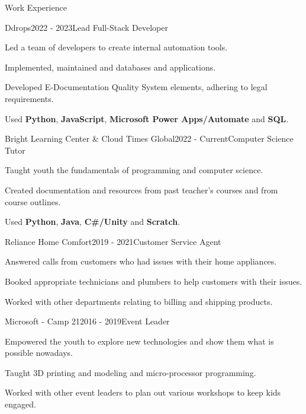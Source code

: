 \documentclass{resume}
\begin{document}
    \begin{rSection}{Work Experience}
        \begin{rSubsection}{Ddrops}{2022 - 2023}{Lead Full-Stack Developer}{}
            \item Led a team of developers to create internal automation tools.
            \item Implemented, maintained and databases and applications.
            \item Developed E-Documentation Quality System elements, adhering to legal requirements.
            \item Used \textbf{Python}, \textbf{JavaScript}, \textbf{Microsoft Power Apps/Automate} and \textbf{SQL}.
        \end{rSubsection}
    
        \begin{rSubsection}{Bright Learning Center \& Cloud Times Global}{2022 - Current}{Computer Science Tutor}{}
            \item Taught youth the fundamentals of programming and computer science.
            \item Created documentation and resources from past teacher's courses and from course outlines.
            \item Used \textbf{Python}, \textbf{Java}, \textbf{C\#/Unity} and \textbf{Scratch}.
        \end{rSubsection}
    
        \begin{rSubsection}{Reliance Home Comfort}{2019 - 2021}{Customer Service Agent}{}
            \item Answered calls from customers who had issues with their home appliances.
            \item Booked appropriate technicians and plumbers to help customers with their issues.
            \item Worked with other departments relating to billing and shipping products.
        \end{rSubsection}
    
        \begin{rSubsection}{Microsoft - Camp 21}{2016 - 2019}{Event Leader}{}
            \item Empowered the youth to explore new technologies and show them what is possible nowadays.
            \item Taught 3D printing and modeling and micro-processor programming.
            \item Worked with other event leaders to plan out various workshops to keep kids engaged.
        \end{rSubsection}
    \end{rSection}
\end{document}
